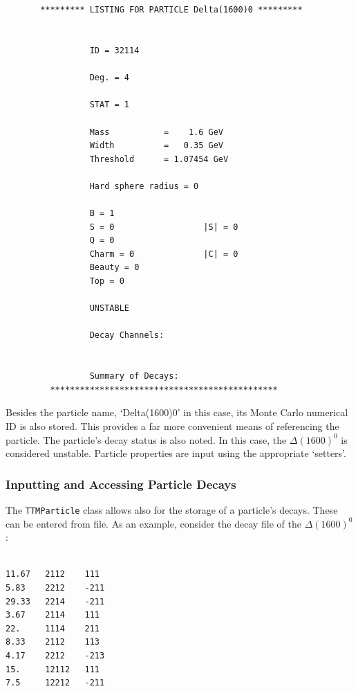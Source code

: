 \documentclass{elsarticle}
\begin{document}
\small
\begin{verbatim}


       ********* LISTING FOR PARTICLE Delta(1600)0 *********


                 ID = 32114

                 Deg. = 4

                 STAT = 1

                 Mass           =    1.6 GeV
                 Width          =   0.35 GeV
                 Threshold      = 1.07454 GeV

                 Hard sphere radius = 0

                 B = 1
                 S = 0                  |S| = 0
                 Q = 0
                 Charm = 0              |C| = 0
                 Beauty = 0
                 Top = 0

                 UNSTABLE

                 Decay Channels:


                 Summary of Decays:
         **********************************************
\end{verbatim}
\normalsize

Besides the particle name, `Delta(1600)0' in this case, its Monte Carlo numerical ID is also 
stored. This provides a far more convenient means of referencing the 
particle. The particle's decay status is also noted. In this case, the 
$\Delta(1600)^0$ is considered unstable. Particle properties are input 
using the appropriate `setters'.\\

\subsubsection{Inputting and Accessing Particle Decays}
The \texttt{TTMParticle} class allows also for the storage of a particle's 
decays. These can be entered 
from file. As an example, consider the decay file of the $\Delta(1600)^0$:

\small
\begin{verbatim}

11.67   2112    111
5.83    2212    -211
29.33   2214    -211
3.67    2114    111
22.     1114    211
8.33    2112    113
4.17    2212    -213
15.     12112   111
7.5     12212   -211

\end{verbatim}
\normalsize
\end{document}
